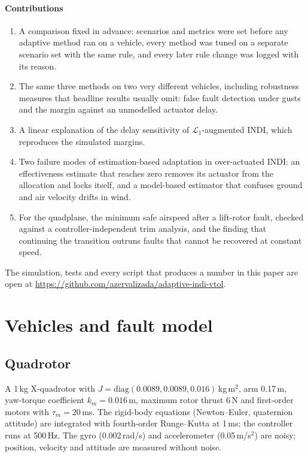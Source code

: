 \documentclass[preprint,12pt,a4paper]{elsarticle}
\begin{document}
\paragraph{Contributions}
\begin{enumerate}
\item A comparison fixed in advance: scenarios and metrics were set before any adaptive method ran on a vehicle, every
  method was tuned on a separate scenario set with the same rule, and every later rule change was logged with its reason.
\item The same three methods on two very different vehicles, including robustness measures that headline results
  usually omit: false fault detection under gusts and the margin against an unmodelled actuator delay.
\item A linear explanation of the delay sensitivity of $\mathcal{L}_1$-augmented INDI, which reproduces the simulated margins.
\item Two failure modes of estimation-based adaptation in over-actuated INDI: an effectiveness estimate that reaches zero removes
  its actuator from the allocation and locks itself, and a model-based estimator that confuses ground and air velocity drifts in wind.
\item For the quadplane, the minimum safe airspeed after a lift-rotor fault, checked against a controller-independent trim
  analysis, and the finding that continuing the transition outruns faults that cannot be recovered at constant speed.
\end{enumerate}
The simulation, tests and every script that produces a number in this paper are open at \url{https://github.com/azervalizada/adaptive-indi-vtol}.

\section{Vehicles and fault model}
\subsection{Quadrotor}
A 1\,kg X-quadrotor with $J = \mathrm{diag}(0.0089, 0.0089, 0.016)$\,kg\,m$^2$, arm 0.17\,m, yaw-torque coefficient
$k_m = 0.016$\,m, maximum rotor thrust 6\,N and first-order motors with $\tau_m = 20$\,ms. The rigid-body equations
(Newton--Euler, quaternion attitude) are integrated with fourth-order Runge--Kutta at 1\,ms; the controller runs at 500\,Hz.
The gyro (0.002\,rad/s) and accelerometer (0.05\,m/s$^2$) are noisy; position, velocity and attitude are measured without noise.
\end{document}
